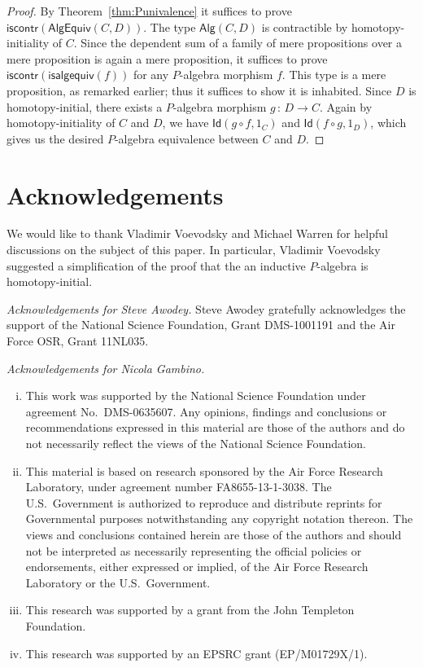 \documentclass[10pt,a4paper,oneside,reqno]{amsart}
\numberwithin{equation}{section}
\theoremstyle{mythm}
\theoremstyle{mydef}
\theoremstyle{myrmk}
\newcommand{\co}{\,{:}\,}
\newcommand{\iscontr}{\mathsf{iscontr}}
\newcommand{\Id}{\mathsf{Id}}
\newcommand{\Palg}{\mathsf{Alg}}
\newcommand{\isalgequiv}{\mathsf{isalgequiv}}
\newcommand{\AlgEquiv}{\mathsf{AlgEquiv}}
\begin{document}
\begin{proof}
By Theorem~\ref{thm:Punivalence} it suffices to prove $\iscontr(\AlgEquiv(C,D))$. The type $\Palg(C,D)$ is contractible by homotopy-initiality of $C$. Since the dependent sum of a family of mere propositions over a mere proposition is again a mere proposition, it suffices to prove $\iscontr(\isalgequiv(f))$ for any $P$-algebra morphism $f$. This type is a mere proposition, as remarked earlier; thus it suffices to show it is inhabited.
Since $D$ is homotopy-initial, there exists a $P$-algebra morphism $g \co D \to C$. Again by homotopy-initiality of $C$ and 
$D$, we have $\Id(g \circ f, 1_C)$ and $\Id(f \circ g, 1_D)$, which gives us the desired $P$-algebra equivalence between 
$C$ and $D$.
\end{proof}



\section*{Acknowledgements}

We would like to thank Vladimir Voevodsky and Michael Warren for helpful discussions
on the subject of this paper. In particular, Vladimir Voevodsky suggested a simplification of the 
proof that the an inductive $P$-algebra is homotopy-initial. \smallskip
 
 \noindent
 \emph{Acknowledgements for Steve Awodey.}  Steve Awodey gratefully acknowledges the support of the National Science Foundation, Grant DMS-1001191 and the Air Force OSR, Grant 11NL035. \smallskip
 
 \noindent
 \emph{Acknowledgements for Nicola Gambino.}   
 \begin{enumerate}[(i)]
 \item This work was supported by the National Science Foundation 
under agreement No.\ DMS-0635607. Any opinions, findings and conclusions or recommendations
expressed in this material are those of the authors and do not necessarily reflect the views of
the National Science Foundation.  
\item This material is based on research sponsored by the Air Force Research Laboratory, under agreement 
number FA8655-13-1-3038. The U.S.\ Government is authorized to reproduce and distribute reprints for Governmental purposes notwithstanding any copyright notation thereon. The views and conclusions contained herein are those of the authors and should not be interpreted as necessarily representing the official policies or endorsements, either expressed or implied, of the Air Force Research Laboratory or the U.S.\ Government.
\item This research was supported by a grant from the John Templeton Foundation.
\item This research was supported by an EPSRC grant (EP/M01729X/1). 
\end{enumerate}
\end{document}
